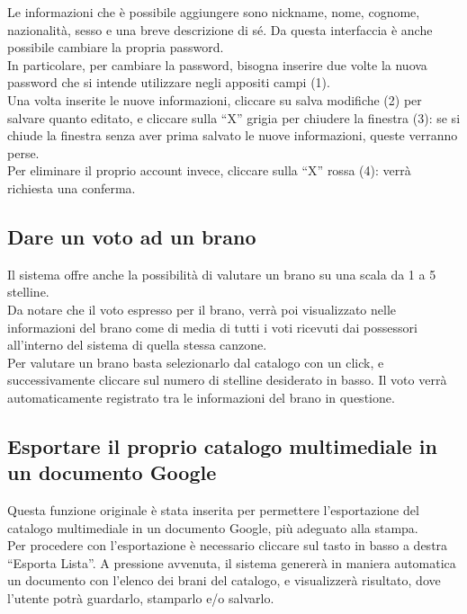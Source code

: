 Le informazioni che \`e possibile aggiungere sono nickname, nome, cognome,
nazionalit\`a, sesso e una breve descrizione di s\'e. Da questa interfaccia \`e
anche possibile cambiare la propria password.\\

In particolare, per cambiare la password, bisogna inserire due volte la nuova
password che si intende utilizzare negli appositi campi (1).\\

Una volta inserite le nuove informazioni, cliccare su salva modifiche (2) per
salvare quanto editato, e cliccare sulla ``X'' grigia per chiudere la finestra
(3): se si chiude la finestra senza aver prima salvato le nuove informazioni,
queste verranno perse.\\

Per eliminare il proprio account invece, cliccare sulla ``X'' rossa (4): verr\`a
richiesta una conferma.

\subsection{Dare un voto ad un brano}
\label{cap:voto}
Il sistema  offre anche la possibilit\`a di valutare un brano su una
scala da 1 a 5 stelline.\\
Da notare che il voto espresso per il brano, verr\`a poi visualizzato nelle
informazioni del brano come di media di tutti i voti ricevuti dai
possessori all'interno del sistema  di quella stessa canzone.\\
Per valutare un brano basta selezionarlo dal catalogo con un click, e
successivamente cliccare sul numero di stelline desiderato in basso. Il voto
verr\`a automaticamente registrato tra le informazioni del brano in questione.

\subsection{Esportare il proprio catalogo multimediale in un documento Google}

Questa funzione originale \`e stata inserita per permettere l'esportazione del
catalogo multimediale in un documento Google, pi\`u adeguato alla stampa.\\
Per procedere con l'esportazione \`e necessario cliccare sul tasto in
basso a destra ``Esporta Lista''. A pressione avvenuta, il sistema generer\`a
in maniera automatica un documento con l'elenco dei brani del catalogo, e
visualizzer\`a risultato, dove l'utente potr\`a guardarlo, stamparlo e/o salvarlo.

